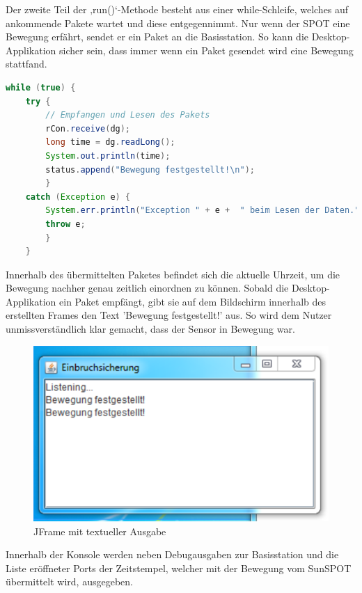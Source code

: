 Der zweite Teil der ‚run()‘-Methode besteht aus einer while-Schleife, welches auf ankommende Pakete wartet und diese entgegennimmt. Nur wenn der SPOT eine Bewegung erfährt, sendet er ein Paket an die Basisstation. So kann die Desktop-Applikation sicher sein, dass immer wenn ein Paket gesendet wird eine Bewegung stattfand.\\

\begin{lstlisting}[language=Java,caption={Auswerten des empfangenen Paketes},label=lst:rcvpackage,frame=single] 
while (true) {
	try {
		// Empfangen und Lesen des Pakets
		rCon.receive(dg);
		long time = dg.readLong();
		System.out.println(time);
		status.append("Bewegung festgestellt!\n");
		} 
	catch (Exception e) {
		System.err.println("Exception " + e +  " beim Lesen der Daten.");
		throw e;
		}
	}
\end{lstlisting}

Innerhalb des übermittelten Paketes befindet sich die aktuelle Uhrzeit, um die Bewegung nachher genau zeitlich einordnen zu können. Sobald die Desktop-Applikation ein Paket empfängt, gibt sie auf dem Bildschirm innerhalb des erstellten Frames den Text 'Bewegung festgestellt!' aus. So wird dem Nutzer unmissverständlich klar gemacht, dass der Sensor in Bewegung war.

\begin{figure}[H] 
	\centering
	\includegraphics[scale=1.0]{Bilder/bewegung}
	\caption{JFrame mit textueller Ausgabe}
	\label{f:bewegung}
\end{figure}

Innerhalb der Konsole werden neben Debugausgaben zur Basisstation und die Liste eröffneter Ports der Zeitstempel, welcher mit der Bewegung vom SunSPOT übermittelt wird, ausgegeben.

